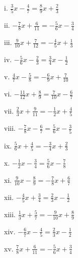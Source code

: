 \documentclass[]{book}
\begin{document}
\begin{multicols}{2}
    i. $\frac{3}{5}x - \frac{4}{7} = \frac{8}{9}x + \frac{2}{3}$
    
    ii. $-\frac{7}{8}x + \frac{6}{11} = -\frac{5}{6}x - \frac{3}{4}$

    iii. $\frac{9}{10}x + \frac{7}{12} = -\frac{4}{5}x + \frac{1}{3}$

    iv. $-\frac{5}{6}x - \frac{2}{3} = \frac{3}{4}x - \frac{1}{2}$

    v. $\frac{4}{7}x - \frac{5}{8} = -\frac{6}{9}x + \frac{7}{10}$

    vi. $-\frac{11}{12}x + \frac{8}{9} = \frac{7}{10}x - \frac{6}{7}$

    vii. $\frac{2}{3}x + \frac{9}{11} = -\frac{1}{2}x + \frac{4}{5}$

    viii. $-\frac{7}{8}x - \frac{6}{7} = \frac{5}{6}x - \frac{3}{5}$

    ix. $\frac{5}{6}x + \frac{4}{5} = -\frac{3}{4}x + \frac{2}{3}$

    x. $-\frac{1}{2}x - \frac{3}{4} = \frac{5}{6}x - \frac{7}{8}$

    xi. $\frac{9}{10}x - \frac{8}{9} = -\frac{7}{8}x + \frac{6}{7}$

    xii. $-\frac{4}{5}x + \frac{3}{4} = \frac{2}{3}x - \frac{1}{2}$

    xiii. $\frac{1}{3}x + \frac{5}{7} = -\frac{9}{10}x + \frac{8}{9}$

    xiv. $-\frac{6}{7}x - \frac{4}{5} = \frac{2}{3}x - \frac{1}{2}$

    xv. $\frac{7}{8}x + \frac{6}{11} = -\frac{5}{6}x + \frac{3}{4}$
\end{multicols}
\end{document}
